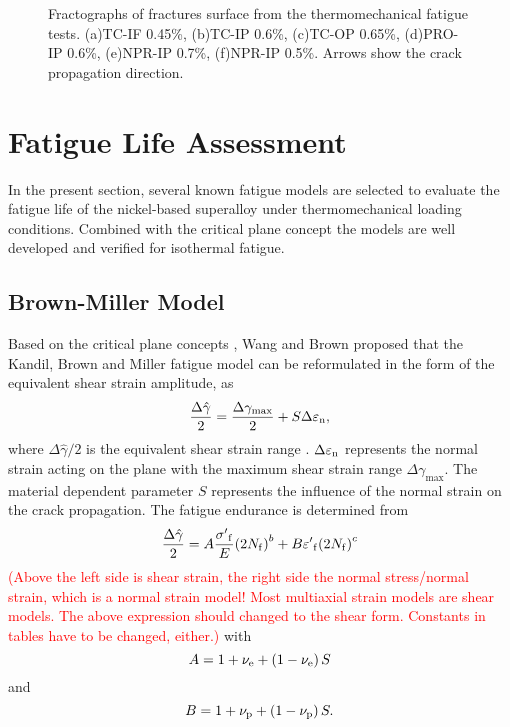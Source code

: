 \documentclass[preprint,5p,twocolumn,11pt,sort&compress]{elsarticle}
\newcommand{\marked}[1]{\textcolor{red}{#1}}
\begin{document}
\begin{figure*}
  \caption{Fractographs of fractures surface from the thermomechanical fatigue tests. (a)TC-IF 0.45\%, (b)TC-IP 0.6\%, (c)TC-OP 0.65\%, (d)PRO-IP 0.6\%, (e)NPR-IP 0.7\%, (f)NPR-IP 0.5\%.  Arrows show the crack propagation direction.}
  \label{Fig:crack_propagation}
\end{figure*}

\section{Fatigue Life Assessment}

In the present section, several known fatigue models are selected to evaluate the fatigue life of the nickel-based superalloy under thermomechanical loading conditions. Combined with the critical plane concept the models are well developed and verified for isothermal fatigue.

\subsection{Brown-Miller Model}
Based on the critical plane concepts \cite{Brown2006}, Wang and Brown \cite{Wang1993} proposed that the Kandil, Brown and Miller fatigue model \cite{Kandil1982} can be reformulated in the form of the equivalent shear strain amplitude, as
\begin{equation}
\frac{{\Delta \hat \gamma }}{2} = \frac{{\Delta {\gamma _{\max}}}}{2} + S\Delta {\varepsilon _{\rm n}},
\label{Equ:ShearStrainBM}
\end{equation}
where ${{\Delta \hat \gamma }}/{2}$ is the equivalent shear strain range \cite{Wang1993}. $\Delta {\varepsilon _{\rm n}}$ represents the normal strain acting on the plane with the maximum shear strain range $\Delta {\gamma _{\max}}$. The material dependent parameter $S$ represents the influence of the normal strain on the crack propagation.
The fatigue endurance is determined from 
\begin{equation}
\frac{{\Delta \hat \gamma }}{2} = A\frac{{{{\sigma '}_{\rm f}}}}{E}{\left( {2{N_{\rm f}}} \right)^b} + B{{\varepsilon '}_{\rm f}}{\left( {2{N_{\rm f}}} \right)^c}
\end{equation}
\marked{(Above the left side is shear strain, the right side the normal stress/normal strain, which is a normal strain model! Most multiaxial strain models are shear models. The above expression should changed to the shear form. Constants in tables have to be changed, either.)}
with
\[A = 1 + {\nu _{\rm e}} + \left( {1 - {\nu _{\rm e}}} \right)S\]
and
\[B = 1 + {\nu _{\rm p}} + \left( {1 - {\nu _{\rm p}}} \right)S.\]
\end{document}
